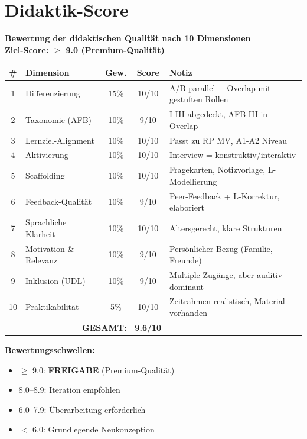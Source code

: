 \documentclass[11pt,a4paper]{article}
\begin{document}
\newpage
\section{Didaktik-Score}

\begin{scorebox}
\textbf{Bewertung der didaktischen Qualität nach 10 Dimensionen}\\
\textbf{Ziel-Score: $\geq$ 9.0 (Premium-Qualität)}

\vspace{1em}
\begin{tabular}{|c|l|c|c|p{4.5cm}|}
\hline
\textbf{\#} & \textbf{Dimension} & \textbf{Gew.} & \textbf{Score} & \textbf{Notiz} \\
\hline
1 & Differenzierung & 15\% & 10/10 & A/B parallel + Overlap mit gestuften Rollen \\
\hline
2 & Taxonomie (AFB) & 10\% & 9/10 & I-III abgedeckt, AFB III in Overlap \\
\hline
3 & Lernziel-Alignment & 10\% & 10/10 & Passt zu RP MV, A1-A2 Niveau \\
\hline
4 & Aktivierung & 10\% & 10/10 & Interview = konstruktiv/interaktiv \\
\hline
5 & Scaffolding & 10\% & 10/10 & Fragekarten, Notizvorlage, L-Modellierung \\
\hline
6 & Feedback-Qualität & 10\% & 9/10 & Peer-Feedback + L-Korrektur, elaboriert \\
\hline
7 & Sprachliche Klarheit & 10\% & 10/10 & Altersgerecht, klare Strukturen \\
\hline
8 & Motivation \& Relevanz & 10\% & 9/10 & Persönlicher Bezug (Familie, Freunde) \\
\hline
9 & Inklusion (UDL) & 10\% & 9/10 & Multiple Zugänge, aber auditiv dominant \\
\hline
10 & Praktikabilität & 5\% & 10/10 & Zeitrahmen realistisch, Material vorhanden \\
\hline
\multicolumn{3}{|r|}{\textbf{GESAMT:}} & \textbf{9.6/10} & \\
\hline
\end{tabular}

\vspace{1em}
\textbf{Bewertungsschwellen:}
\begin{itemize}
    \item[\checkmark] \textcolor{successgreen}{$\geq$ 9.0: \textbf{FREIGABE} (Premium-Qualität)}
    \item[$\Box$] \textcolor{warningorange}{8.0--8.9: Iteration empfohlen}
    \item[$\Box$] 6.0--7.9: Überarbeitung erforderlich
    \item[$\Box$] $<$ 6.0: Grundlegende Neukonzeption
\end{itemize}


\end{scorebox}
\end{document}
